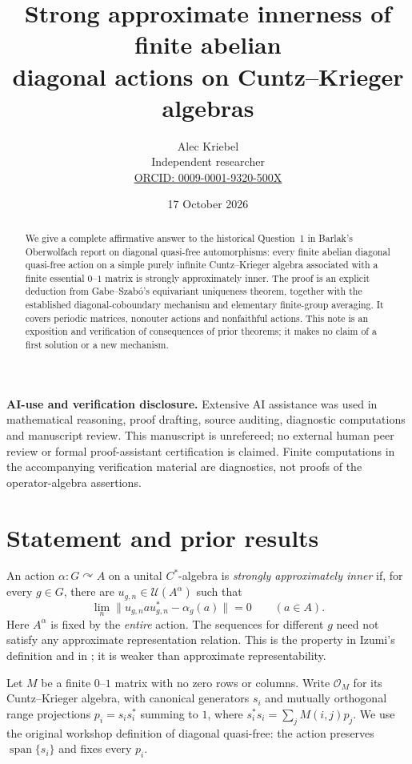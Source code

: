 \documentclass[11pt,a4paper]{article}
\title{Strong approximate innerness of finite abelian\protect\\
diagonal actions on Cuntz--Krieger algebras}
\author{Alec Kriebel\\\small Independent researcher\\
\small\href{https://orcid.org/0009-0001-9320-500X}{ORCID: 0009-0001-9320-500X}}
\date{17 October 2026}
\theoremstyle{definition}
\newcommand{\U}{\mathcal U}
\begin{document}
\maketitle
\begin{abstract}
We give a complete affirmative answer to the historical Question~1 in
Barlak's Oberwolfach report on diagonal quasi-free automorphisms: every
finite abelian diagonal quasi-free action on a simple purely infinite
Cuntz--Krieger algebra associated with a finite essential $0$--$1$ matrix
is strongly approximately inner. The proof is an explicit deduction from
Gabe--Szab\'o's equivariant uniqueness theorem, together with the established
diagonal-coboundary mechanism and elementary finite-group averaging.
It covers periodic matrices, nonouter actions and nonfaithful actions.
This note is an exposition and verification of consequences of prior
theorems; it makes no claim of a first solution or a new mechanism.
\end{abstract}

\noindent\textbf{AI-use and verification disclosure.}
Extensive AI assistance was used in mathematical reasoning, proof drafting,
source auditing, diagnostic computations and manuscript review. This
manuscript is unrefereed; no external human peer review or formal
proof-assistant certification is claimed. Finite computations in the
accompanying verification material are diagnostics, not proofs of the
operator-algebra assertions.

\section{Statement and prior results}

An action $\alpha:G\curvearrowright A$ on a unital $C^*$-algebra is
\emph{strongly approximately inner} if, for every $g\in G$, there are
$u_{g,n}\in\U(A^\alpha)$ such that
\[
 \lim_n\|u_{g,n}a u_{g,n}^*-\alpha_g(a)\|=0\qquad(a\in A).
\]
Here $A^\alpha$ is fixed by the \emph{entire} action. The sequences for
different $g$ need not satisfy any approximate representation relation.
This is the property in Izumi's definition and in
\cite[Definition~2.5]{BS}; it is weaker than approximate representability.

Let $M$ be a finite $0$--$1$ matrix with no zero rows or columns. Write
$\mathcal O_M$ for its Cuntz--Krieger algebra, with canonical generators
$s_i$ and mutually orthogonal range projections $p_i=s_i s_i^*$ summing
to $1$, where $s_i^*s_i=\sum_j M(i,j)p_j$. We use the original workshop
definition of diagonal quasi-free: the action preserves
$\operatorname{span}\{s_i\}$ and fixes every $p_i$.
\end{document}
